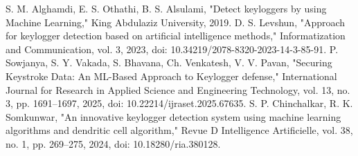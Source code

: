 \documentclass[conference]{IEEEtran}
\begin{document}
\begin{thebibliography}{99}
 S. M. Alghamdi, E. S. Othathi, B. S. Alsulami, "Detect keyloggers by using Machine Learning," King Abdulaziz University, 2019.
 D. S. Levshun, "Approach for keylogger detection based on artificial intelligence methods," Informatization and Communication, vol. 3, 2023, doi: 10.34219/2078-8320-2023-14-3-85-91.
 P. Sowjanya, S. Y. Vakada, S. Bhavana, Ch. Venkatesh, V. V. Pavan, "Securing Keystroke Data: An ML-Based Approach to Keylogger defense," International Journal for Research in Applied Science and Engineering Technology, vol. 13, no. 3, pp. 1691–1697, 2025, doi: 10.22214/ijraset.2025.67635.
 S. P. Chinchalkar, R. K. Somkunwar, "An innovative keylogger detection system using machine learning algorithms and dendritic cell algorithm," Revue D Intelligence Artificielle, vol. 38, no. 1, pp. 269–275, 2024, doi: 10.18280/ria.380128.
\end{thebibliography}
\end{document}
